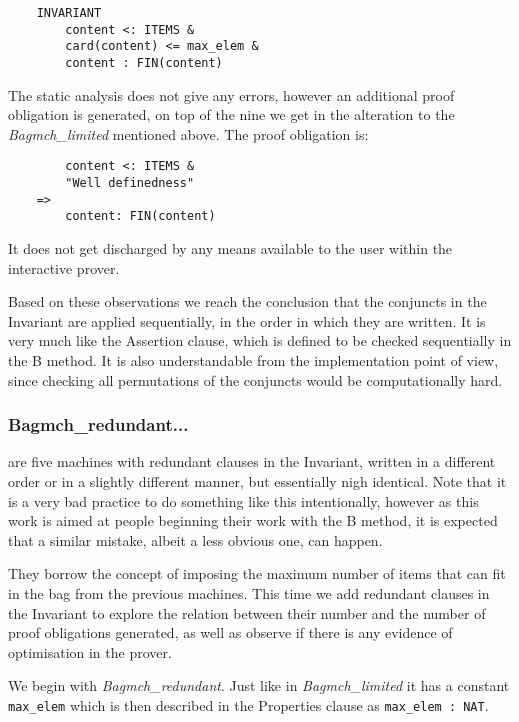 \documentclass[11pt,journal]{IEEEtran}
\begin{document}
	\begin{lstlisting}
	INVARIANT
		content <: ITEMS &
		card(content) <= max_elem & 
		content : FIN(content)
	\end{lstlisting}
	
	The static analysis does not give any errors, however an additional proof obligation is generated, on top of the nine we get in the alteration to the \emph{Bagmch\_limited} mentioned above. The proof obligation is:
	
	\begin{lstlisting}
    	content <: ITEMS &
		"Well definedness" 
	=>
		content: FIN(content) 
	\end{lstlisting}
	
	It does not get discharged by any means available to the user within the interactive prover.	
	
	Based on these observations we reach the conclusion that the conjuncts in the Invariant are applied sequentially, in the order in which they are written. It is very much like the Assertion clause, which is defined to be checked sequentially in the B method. It is also understandable from the implementation point of view, since checking all permutations of the conjuncts would be computationally hard.
	
	\subsubsection{Bagmch\_redundant...} are five machines with redundant clauses in the Invariant, written in a different order or in a slightly different manner, but essentially nigh identical. Note that it is a very bad practice to do something like this intentionally, however as this work is aimed at people beginning their work with the B method, it is expected that a similar mistake, albeit a less obvious one, can happen.
	
	They borrow the concept of imposing the maximum number of items that can fit in the bag from the previous machines. This time we add redundant clauses in the Invariant to explore the relation between their number and the number of proof obligations generated, as well as observe if there is any evidence of optimisation in the prover.
	
	We begin with \emph{Bagmch\_redundant}. Just like in \emph{Bagmch\_limited} it has a constant \texttt{max\_elem} which is then described in the Properties clause as \texttt{max\_elem : NAT}.
	
\end{document}
